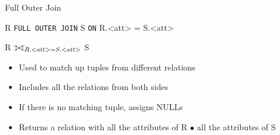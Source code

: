 \documentclass[aspectratio=169]{beamer}
\def\ojoin{\setbox0=\hbox{$\bowtie$}%
  \rule[-.02ex]{.25em}{.4pt}\llap{\rule[\ht0]{.25em}{.4pt}}}
\def\fullouterjoin{\mathbin{\ojoin\mkern-5.8mu\bowtie\mkern-5.8mu\ojoin}}
\begin{document}
\begin{frame}{Full Outer Join}

R \texttt{FULL OUTER JOIN} S \texttt{ON} R.<att> = S.<att>

R $\fullouterjoin_{R.<att> = S.<att>}$ S

\begin{itemize}
\item Used to match up tuples from different relations
\item Includes all the relations from both sides 
\item If there is no matching tuple, assigns NULLs
\item Returns a relation with all the attributes of R $\bullet$ all the attributes of S
\end{itemize}
\end{frame}
\end{document}
